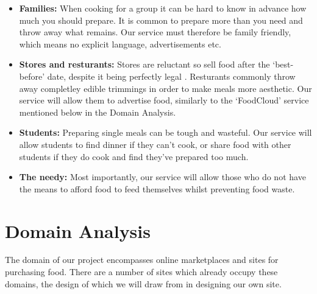 \documentclass[12pt]{article}
\begin{document}
\begin{itemize}
	\item \textbf{Families:} When cooking for a group it can be hard to know in advance how much you should prepare.
			It is common to prepare more than you need and throw away what remains.
			Our service must therefore be family friendly, which means no explicit language, advertisements etc.
	\item \textbf{Stores and resturants:} Stores are reluctant so sell food after the `best-before' date, despite it being perfectly legal \cite{govuk}.
			Resturants commonly throw away completley edible trimmings in order to make meals more aesthetic. Our service will allow them to advertise food,
			similarly to the `FoodCloud' service mentioned below in the Domain Analysis.
	\item \textbf{Students:} Preparing single meals can be tough and wasteful. Our service will allow students to find dinner if they can't cook, or share food
			with other students if they do cook and find they've prepared too much.
	\item \textbf{The needy:} Most importantly, our service will allow those who do not have the means to afford food to feed themselves whilst preventing food waste.
\end{itemize}


\section{Domain Analysis}

The domain of our project encompasses online marketplaces and sites for purchasing food.
There are a number of sites which already occupy these domains,
the design of which we will draw from in designing our own site.
\end{document}
